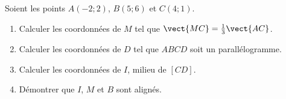
\begin{exercice}\label{exosmath-0663}

    Soient les points \( A(-2;2)\), \( B(5;6)\) et \( C(4;1)\).
    \begin{enumerate}
        \item
            Calculer les coordonnées de \( M\) tel que \( \vect{ MC }=\frac{1}{ 3 }\vect{ AC }\).
        \item
            Calculer les coordonnées de \( D\) tel que \( ABCD\) soit un parallélogramme.
        \item
            Calculer les coordonnées de \( I\), milieu de \( [CD]\). 
        \item
            Démontrer que \( I\), \( M\) et \( B\) sont alignés.
    \end{enumerate}

\end{exercice}
